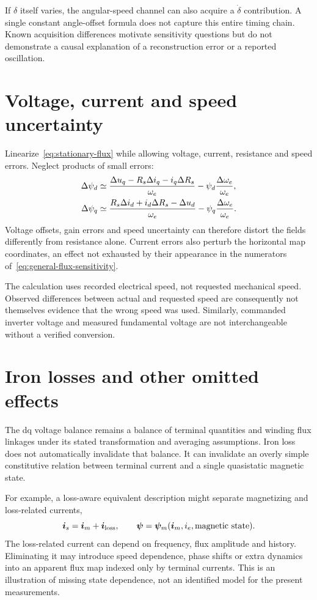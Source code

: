 If $\delta$ itself varies, the angular-speed channel can also acquire a $\dot\delta$ contribution. A single constant angle-offset formula does not capture this entire timing chain. Known acquisition differences motivate sensitivity questions but do not demonstrate a causal explanation of a reconstruction error or a reported oscillation.

\section{Voltage, current and speed uncertainty}
Linearize~\eqref{eq:stationary-flux} while allowing voltage, current, resistance and speed errors. Neglect products of small errors:
\begin{align}
\Delta\psi_d&\simeq
\frac{\Delta u_q-R_s\Delta i_q-i_q\Delta R_s}{\omega_e}
-\psi_d\frac{\Delta\omega_e}{\omega_e},\notag\\
\Delta\psi_q&\simeq
\frac{R_s\Delta i_d+i_d\Delta R_s-\Delta u_d}{\omega_e}
-\psi_q\frac{\Delta\omega_e}{\omega_e}.
\label{eq:general-flux-sensitivity}
\end{align}
Voltage offsets, gain errors and speed uncertainty can therefore distort the fields differently from resistance alone. Current errors also perturb the horizontal map coordinates, an effect not exhausted by their appearance in the numerators of~\eqref{eq:general-flux-sensitivity}.

The calculation uses recorded electrical speed, not requested mechanical speed. Observed differences between actual and requested speed are consequently not themselves evidence that the wrong speed was used. Similarly, commanded inverter voltage and measured fundamental voltage are not interchangeable without a verified conversion.

\section{Iron losses and other omitted effects}
The dq voltage balance remains a balance of terminal quantities and winding flux linkages under its stated transformation and averaging assumptions. Iron loss does not automatically invalidate that balance. It can invalidate an overly simple constitutive relation between terminal current and a single quasistatic magnetic state.

For example, a loss-aware equivalent description might separate magnetizing and loss-related currents,
\begin{equation}
\bm i_s=\bm i_m+\bm i_{\rm loss},
\qquad
\bm\psi=\bm\psi_m(\bm i_m,i_e,\text{magnetic state}).
\end{equation}
The loss-related current can depend on frequency, flux amplitude and history. Eliminating it may introduce speed dependence, phase shifts or extra dynamics into an apparent flux map indexed only by terminal currents. This is an illustration of missing state dependence, not an identified model for the present measurements.

